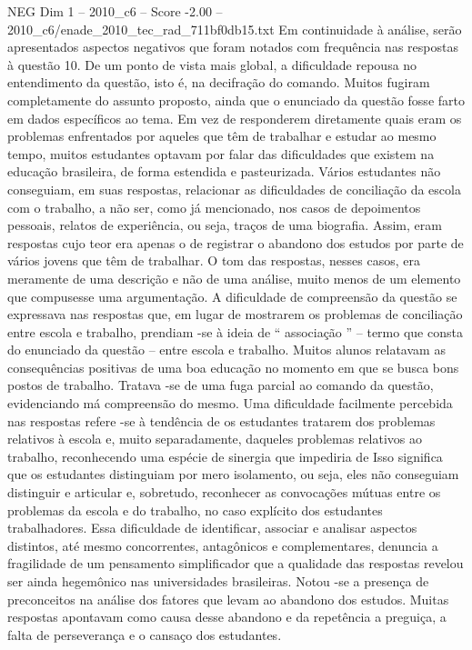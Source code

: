 \begin{textsample}{NEG Dim 1 – 2010\_c6 – Score -2.00 – 2010\_c6/enade\_2010\_tec\_rad\_711bf0db15.txt}
Em continuidade à análise, serão apresentados aspectos negativos que foram notados com frequência nas respostas à questão 10.
De um ponto de vista mais global, a dificuldade repousa no entendimento da questão, isto é, na decifração do comando.
Muitos fugiram completamente do assunto proposto, ainda que o enunciado da questão fosse farto em dados específicos ao tema.
Em vez de responderem diretamente quais eram os problemas enfrentados por aqueles que têm de trabalhar e estudar ao mesmo tempo, muitos estudantes optavam por falar das dificuldades que existem na educação brasileira, de forma estendida e pasteurizada.
Vários estudantes não conseguiam, em suas respostas, relacionar as dificuldades de conciliação da escola com o trabalho, a não ser, como já mencionado, nos casos de depoimentos pessoais, relatos de experiência, ou seja, traços de uma biografia.
Assim, eram respostas cujo teor era apenas o de registrar o abandono dos estudos por parte de vários jovens que têm de trabalhar.
O tom das respostas, nesses casos, era meramente de uma descrição e não de uma análise, muito menos de um elemento que compusesse uma argumentação.
A dificuldade de compreensão da questão se expressava nas respostas que, em lugar de mostrarem os problemas de conciliação entre escola e trabalho, prendiam -se à ideia de “ associação ” – termo que consta do enunciado da questão – entre escola e trabalho.
Muitos alunos relatavam as consequências positivas de uma boa educação no momento em que se busca bons postos de trabalho.
Tratava -se de uma fuga parcial ao comando da questão, evidenciando má compreensão do mesmo.
Uma dificuldade facilmente percebida nas respostas refere -se à tendência de os estudantes tratarem dos problemas relativos à escola e, muito separadamente, daqueles problemas relativos ao trabalho, reconhecendo uma espécie de sinergia que impediria de Isso significa que os estudantes distinguiam por mero isolamento, ou seja, eles não conseguiam distinguir e articular e, sobretudo, reconhecer as convocações mútuas entre os problemas da escola e do trabalho, no caso explícito dos estudantes trabalhadores.
Essa dificuldade de identificar, associar e analisar aspectos distintos, até mesmo concorrentes, antagônicos e complementares, denuncia a fragilidade de um pensamento simplificador que a qualidade das respostas revelou ser ainda hegemônico nas universidades brasileiras.
Notou -se a presença de preconceitos na análise dos fatores que levam ao abandono dos estudos.
Muitas respostas apontavam como causa desse abandono e da repetência a preguiça, a falta de perseverança e o cansaço dos estudantes.

\end{textsample}
